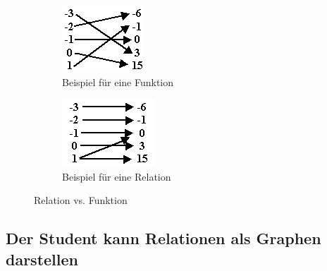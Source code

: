 \begin{figure}[h!]
	\centering
	\begin{subfigure}[b]{0.27\textwidth}
		\includegraphics[width=\textwidth]{fig/funktion.png}
		\caption{Beispiel für eine Funktion}
	\end{subfigure}
	\begin{subfigure}[b]{0.3\textwidth}
		\includegraphics[width=\textwidth]{fig/relation.png}
		\caption{Beispiel für eine Relation}
	\end{subfigure}
	\caption{Relation vs. Funktion}
	\label{fig:relation-funktion}
\end{figure} 

\subsection{Der Student kann Relationen als Graphen darstellen}

